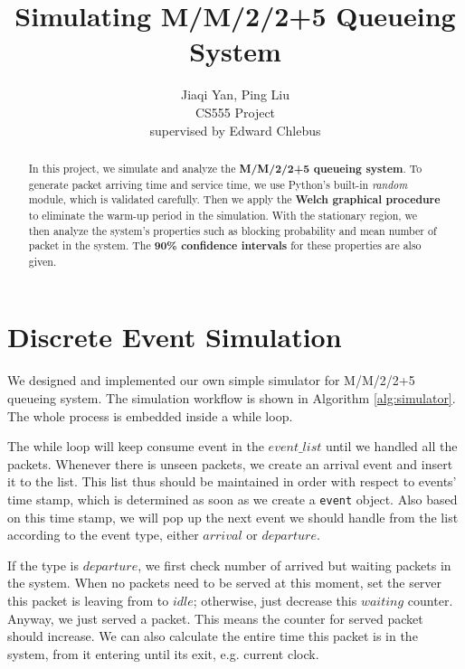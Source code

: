 \documentclass[12pt]{article}  %
\title{Simulating M/M/2/2+5 Queueing System}
\author{Jiaqi Yan, Ping Liu\\
CS555 Project\\
supervised by
Edward Chlebus}
\theoremstyle{definition}
\theoremstyle{remark}
\begin{document}
\maketitle

\begin{abstract}
In this project, we simulate and analyze the \textbf{M/M/2/2+5 queueing system}. 
To generate packet arriving time and service time, we use Python's built-in \textit{random} module, which is validated carefully.
Then we apply the \textbf{Welch graphical procedure} to eliminate the warm-up period in the simulation.
With the stationary region, we then analyze the system's properties such as blocking probability and mean number of packet in the system.
The \textbf{90\% confidence intervals} for these properties are also given.
\end{abstract}

\newpage
\tableofcontents

\newpage
\section{Discrete Event Simulation}\label{sec:des}
We designed and implemented our own simple simulator for M/M/2/2+5 queueing system.
The simulation workflow is shown in Algorithm \ref{alg:simulator}.
The whole process is embedded inside a while loop.

The while loop will keep consume event in the $event\_list$ until we handled all the packets.
Whenever there is unseen packets, we create an arrival event and insert it to the list.
This list thus should be maintained in order with respect to events' time stamp, which is determined as soon as we create a \texttt{event} object.
Also based on this time stamp, we will pop up the next event we should handle from the list according to the event type, either $arrival$ or $departure$.

If the type is $departure$, we first check number of arrived but waiting packets in the system.
When no packets need to be served at this moment, set the server this packet is leaving from to $idle$;
otherwise, just decrease this $waiting$ counter.
Anyway, we just served a packet.
This means the counter for served packet should increase.
We can also calculate the entire time this packet is in the system, from it entering until its exit, e.g. current clock.
\end{document}

